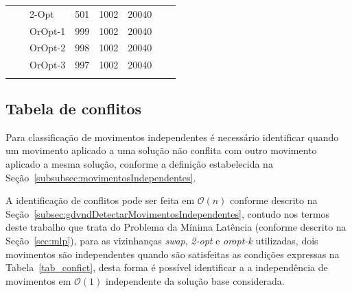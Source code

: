 \begin{table}[ht]
\begin{tabular}{llllllll}
                            & & 2-Opt        & 501      & 1002      & 20040   \\
                            & & OrOpt-1      & 999      & 1002      & 20040   \\
                            & & OrOpt-2      & 998      & 1002      & 20040   \\ 
                            & & OrOpt-3      & 997      & 1002      & 20040   \\
                            & &              &          &           &    \\
\hline
\end{tabular}
\end{table}

\subsection{Tabela de conflitos}

Para classificação de movimentos independentes é necessário identificar quando um movimento aplicado a uma solução não conflita com outro movimento aplicado a mesma solução, conforme a definição estabelecida na Seção~\ref{subsubsec:movimentosIndependentes}.

A identificação de conflitos pode ser feita em $\mathcal{O}(n)$ conforme descrito na Seção~\ref{subsec:gdvndDetectarMovimentosIndependentes}, contudo nos termos deste trabalho que trata do Problema da Mínima Latência (conforme descrito na Seção~\ref{sec:mlp}), para as vizinhanças \textit{swap}, \textit{2-opt} e \textit{oropt-k} utilizadas, dois movimentos são independentes quando são satisfeitas as condições expressas na Tabela~\ref{tab_confict}, desta forma é possível identificar a a independência de movimentos em $\mathcal{O}(1)$ independente da solução base considerada.

